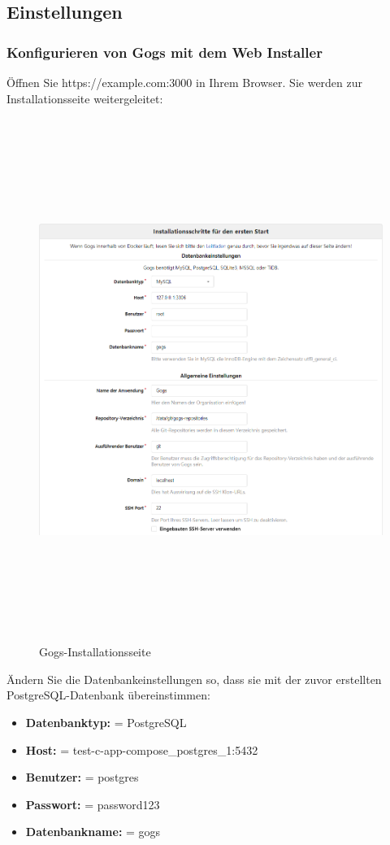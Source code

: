\documentclass[a4paper,12pt,oneside]{book}
\begin{document}
\subsection{Einstellungen}
\subsubsection{Konfigurieren von Gogs mit dem Web Installer}
Öffnen Sie https://example.com:3000 in Ihrem Browser. Sie werden zur Installationsseite weitergeleitet:
\begin{figure}[h!]
	\begin{center}
		\includegraphics[width=15cm, height=17cm]{gogsWebInstaller.PNG}
		\caption{Gogs-Installationsseite} 
		\label{Gogs-Installationsseite} 
	\end{center}
\end{figure}
\newpage
Ändern Sie die Datenbankeinstellungen so, dass sie mit der zuvor erstellten PostgreSQL-Datenbank übereinstimmen:
\begin{itemize}
	\item \textbf{Datenbanktyp: }= PostgreSQL
	\item \textbf{Host: }= test-c-app-compose_postgres_1:5432
	\item \textbf{Benutzer: }= postgres
	\item \textbf{Passwort: }= password123
	\item \textbf{Datenbankname: }= gogs
\end{itemize}
\end{document}
